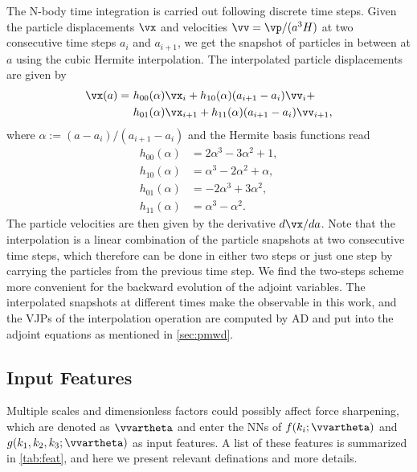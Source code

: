 \documentclass[modern, trackchanges, dvipsnames]{aastex631}
\renewcommand{\d}{d}
\begin{document}
The N-body time integration is carried out following discrete time steps. Given
the particle displacements $\vx$ and velocities $\vv = \vp/(a^3H)$ at two
consecutive time steps $a_i$ and $a_{i+1}$, we get the snapshot of particles in
between at $a$ using
the cubic Hermite interpolation.
The interpolated particle displacements are given by
\begin{align}
  \vx(a) =\ &h_{00}(\alpha)\vx_i + h_{10}(\alpha)(a_{i+1} - a_i)\vv_i + \nonumber\\
           &h_{01}(\alpha)\vx_{i+1} + h_{11}(\alpha)(a_{i+1} - a_i)\vv_{i+1},
\end{align}
where $\alpha := (a - a_i)/(a_{i+1} - a_i)$ and the Hermite basis functions read
\begin{align}
  h_{00}(\alpha) &= 2\alpha^3 - 3\alpha^2 + 1, \nonumber\\
  h_{10}(\alpha) &= \alpha^3 - 2\alpha^2 + \alpha, \nonumber\\
  h_{01}(\alpha) &= -2\alpha^3 + 3\alpha^2, \nonumber\\
  h_{11}(\alpha) &= \alpha^3 - \alpha^2.
\end{align}
The particle velocities are then given by the derivative $\d\vx / \d a$.
Note that the interpolation is a linear combination of the particle snapshots at
two consecutive time steps, which therefore can be done in either two steps or
just one step by carrying the particles from the previous time step.
We find the two-steps scheme more convenient for the backward evolution of the
adjoint variables.
The interpolated snapshots at different times make the observable in this work,
and the VJPs of the interpolation operation are computed by AD and put into the
adjoint equations as mentioned in \autoref{sec:pmwd}.


\vspace{1em}
\subsection{Input Features}
\label{sec:features}

Multiple scales and dimensionless factors could possibly affect force
sharpening, which are denoted as $\vvartheta$ and enter the NNs of $f(k_i;
\vvartheta)$ and $g(k_1, k_2, k_3; \vvartheta)$ as input features.
A list of these features is summarized in \autoref{tab:feat}, and here we
present relevant definations and more details.
\end{document}
